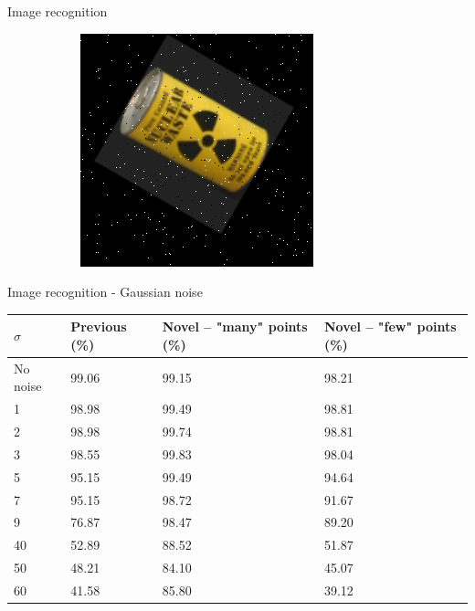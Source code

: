 \documentclass{beamer}
\begin{document}
\begin{frame}{Image recognition}
\begin{figure}[tbp]
\begin{subfigure}{0.25\textwidth}
    \includegraphics[width=\textwidth]{figures/noise/pepper1.png}
	\end{subfigure}
\end{figure}
\end{frame}

\begin{frame}{Image recognition - Gaussian noise}
    \vskip 1cm
    \begin{table}[tbp]
        \centering
        \begin{tabular}{|p{1.5cm}|p{2.2cm}|p{2.7cm}|p{2.5cm}|} \hline
            $\sigma$ & \textbf{Previous} (\%) & \textbf{Novel} -- "many" points (\%)& \textbf{Novel} -- "few" points (\%) \\ \hline\hline
            No noise & 99.06 & 99.15 & 98.21 \\ \hline
            1 & 98.98 & 99.49 & 98.81 \\ \hline
            2 & 98.98 & 99.74 & 98.81 \\ \hline
            3 & 98.55 & 99.83 & 98.04 \\ \hline
            5 & 95.15 & 99.49 & 94.64 \\ \hline
            7 & 95.15 & 98.72 & 91.67 \\ \hline
            9 & 76.87 & 98.47 & 89.20 \\ \hline
            40 & 52.89 & 88.52 & 51.87 \\ \hline
            50 & 48.21 & 84.10 & 45.07 \\ \hline
            60 & 41.58 & 85.80 & 39.12 \\ \hline
        \end{tabular}
    \end{table}
\end{frame}
\end{document}
